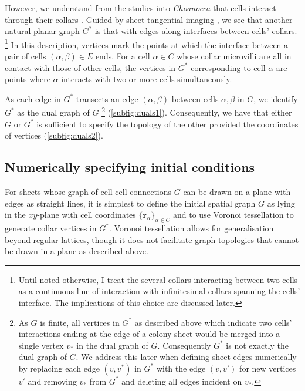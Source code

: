 However, we understand from the studies into \textit{Choanoeca} that cells interact through their collars \citep{ellis1930,leadbeater1983,brunet2019}. Guided by sheet-tangential imaging , we see that another natural planar graph $G^*$ is that with edges along interfaces between cells' collars. \footnote{Until noted otherwise, I treat the several collars interacting between two cells as a continuous line of interaction with infinitesimal collars spanning the cells' interface. The implications of this choice are discussed later.} In this description, vertices mark the points at which the interface between a pair of cells $(\alpha, \beta)\in E$ ends. For a cell $\alpha\in C$ whose collar microvilli are all in contact with those of other cells, the vertices in $G^*$ corresponding to cell $\alpha$ are points where $\alpha$ interacts with two or more cells simultaneously.

As each edge in $G^*$ transects an edge $(\alpha, \beta)$ between cells $\alpha, \beta$ in $G$, we identify $G^*$ as the dual graph of $G$ \footnote{As $G$ is finite, all vertices in $G^*$ as described above which indicate two cells' interactions ending at the edge of a colony sheet would be merged into a single vertex $v_*$ in the dual graph of $G$. Consequently $G^*$ is not exactly the dual graph of $G$. We address this later when defining sheet edges numerically by replacing each edge $(v, v^*)$ in $G^*$ with the edge $(v, v')$ for new vertices $v'$ and removing $v_*$ from $G^*$ and deleting all edges incident on $v_*$.} (\cref{subfig:duals1}). Consequently, we have that either $G$ or $G^*$ is sufficient to specify the topology of the other provided the coordinates of vertices (\cref{subfig:duals2}). 


\subsection{Numerically specifying initial conditions}

For sheets whose graph of cell-cell connections $G$ can be drawn on a plane with edges as straight lines, it is simplest to define the initial spatial graph $G$ as lying in the $xy$-plane with cell coordinates $\{\bm{r}_\alpha\}_{\alpha\in C}$ and to use Voronoi tessellation to generate collar vertices in $G^*$. Voronoi tessellation allows for generalisation beyond regular lattices, though it does not facilitate graph topologies that cannot be drawn in a plane as described above. 

